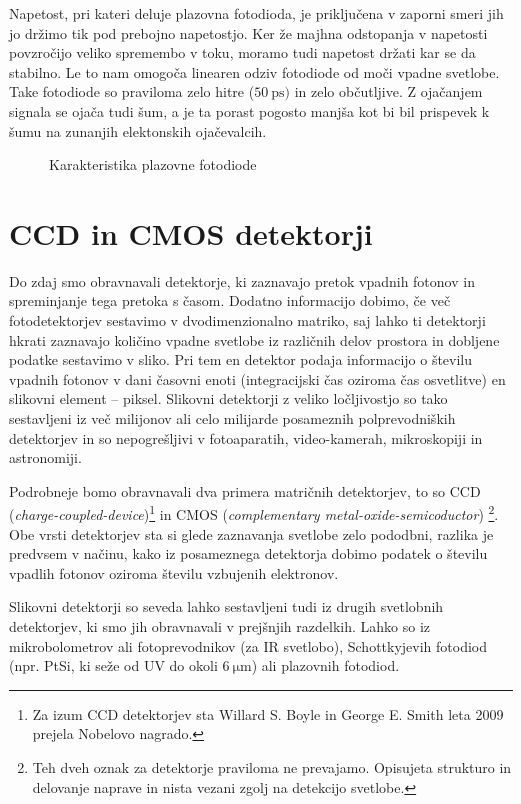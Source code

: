 Napetost, pri kateri deluje plazovna fotodioda, je priključena v zaporni smeri jih jo 
držimo tik pod prebojno napetostjo. Ker že  majhna odstopanja v napetosti povzročijo veliko
spremembo v toku, moramo tudi napetost držati kar se da stabilno. Le to nam omogoča
linearen odziv fotodiode od moči vpadne svetlobe. Take fotodiode so praviloma zelo hitre 
($50~\si{\pico\second})$ in zelo občutljive. Z ojačanjem signala se ojača tudi šum, a je ta 
porast pogosto manjša kot bi bil prispevek k šumu na zunanjih elektonskih ojačevalcih. 

\begin{figure}[h]
\centering
\def\svgwidth{60truemm} 

\caption{Karakteristika plazovne fotodiode}
\label{11_plaz}
\end{figure}

\section{CCD in CMOS detektorji}
Do zdaj smo obravnavali detektorje, ki zaznavajo pretok vpadnih fotonov in spreminjanje
tega pretoka s časom. Dodatno informacijo dobimo, če več fotodetektorjev sestavimo v 
dvodimenzionalno matriko, saj lahko ti detektorji hkrati zaznavajo količino vpadne svetlobe 
iz različnih delov prostora in dobljene podatke sestavimo v sliko. Pri tem en detektor
podaja informacijo o številu vpadnih fotonov v dani časovni enoti (integracijski čas
oziroma čas osvetlitve) en slikovni 
element -- piksel. Slikovni detektorji z veliko ločljivostjo so tako sestavljeni iz 
več milijonov ali celo milijarde posameznih polprevodniških detektorjev in so 
nepogrešljivi v fotoaparatih, video-kamerah, mikroskopiji in astronomiji.

Podrobneje bomo obravnavali dva primera matričnih detektorjev, to so CCD 
({\it charge-coupled-device})\footnote{Za izum CCD detektorjev sta Willard 
S. Boyle in George E. Smith  leta 2009 prejela Nobelovo nagrado.} 
in CMOS ({\it complementary metal-oxide-semicoductor})
\footnote{Teh dveh oznak za detektorje praviloma ne prevajamo. Opisujeta 
strukturo in delovanje naprave in nista vezani zgolj na detekcijo svetlobe.}. Obe vrsti
detektorjev sta si glede zaznavanja svetlobe zelo pododbni, razlika
je predvsem v načinu, kako iz posameznega detektorja dobimo podatek o številu 
vpadlih fotonov oziroma številu vzbujenih elektronov.

\begin{remark}
Slikovni detektorji so seveda lahko sestavljeni tudi iz drugih svetlobnih detektorjev, 
ki smo jih obravnavali v prejšnjih razdelkih. Lahko so iz mikrobolometrov
ali fotoprevodnikov (za IR svetlobo), Schottkyjevih fotodiod (npr. PtSi, ki seže od UV do
okoli $6~\si{\micro\meter}$) ali plazovnih fotodiod.
\end{remark}

